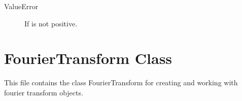 \documentclass[letterpaper,10pt,english]{sphinxmanual}
\begin{document}
\begin{fulllineitems}
\begin{fulllineitems}
\begin{description}
\begin{description}
\item[{ValueError}] \leavevmode
If  is not positive.

\end{description}

\end{description}

\end{fulllineitems}


\end{fulllineitems}



\chapter{FourierTransform Class}
\label{\detokenize{index:fouriertransform-class}}
This file contains the class FourierTransform for creating and 
working with fourier transform objects.
\end{document}
